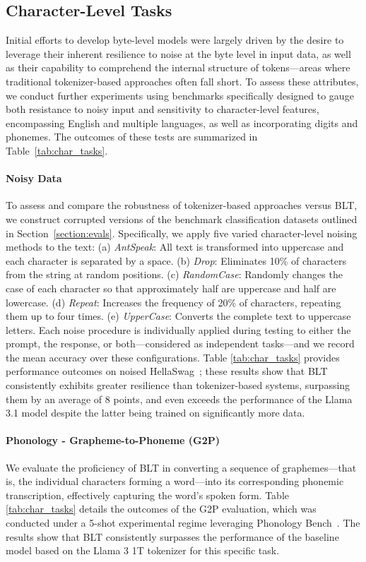 \subsection{Character-Level Tasks}

Initial efforts to develop byte-level models were largely driven by the desire to leverage their inherent resilience to noise at the byte level in input data, as well as their capability to comprehend the internal structure of tokens—areas where traditional tokenizer-based approaches often fall short. To assess these attributes, we conduct further experiments using benchmarks specifically designed to gauge both resistance to noisy input and sensitivity to character-level features, encompassing English and multiple languages, as well as incorporating digits and phonemes. The outcomes of these tests are summarized in Table~\ref{tab:char_tasks}.

\paragraph{Noisy Data} To assess and compare the robustness of tokenizer-based approaches versus {\textsc BLT}, we construct corrupted versions of the benchmark classification datasets outlined in Section~\ref{section:evals}. Specifically, we apply five varied character-level noising methods to the text: (a) \textit{AntSpeak}: All text is transformed into uppercase and each character is separated by a space. (b) \textit{Drop}: Eliminates 10\% of characters from the string at random positions. (c) \textit{RandomCase}: Randomly changes the case of each character so that approximately half are uppercase and half are lowercase. (d) \textit{Repeat}: Increases the frequency of 20\% of characters, repeating them up to four times. (e) \textit{UpperCase}: Converts the complete text to uppercase letters. Each noise procedure is individually applied during testing to either the prompt, the response, or both—considered as independent tasks—and we record the mean accuracy over these configurations. Table \ref{tab:char_tasks} provides performance outcomes on noised HellaSwag~\citep{Eval_hellaswag}; these results show that {\textsc BLT} consistently exhibits greater resilience than tokenizer-based systems, surpassing them by an average of 8 points, and even exceeds the performance of the Llama 3.1 model despite the latter being trained on significantly more data.

\paragraph{Phonology - Grapheme-to-Phoneme (G2P)} We evaluate the proficiency of {\textsc BLT} in converting a sequence of graphemes—that is, the individual characters forming a word—into its corresponding phonemic transcription, effectively capturing the word’s spoken form. Table \ref{tab:char_tasks} details the outcomes of the G2P evaluation, which was conducted under a 5-shot experimental regime leveraging Phonology Bench~\citep{suvarna2024phonologybench}. The results show that {\textsc BLT} consistently surpasses the performance of the baseline model based on the Llama 3 1T tokenizer for this specific task.

